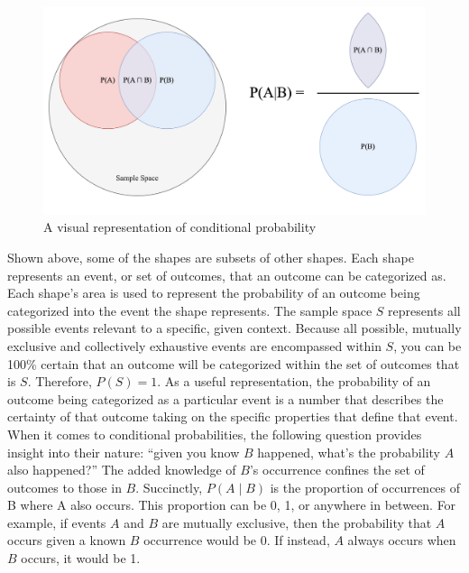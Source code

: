 \documentclass[12pt]{article}
\begin{document}
\begin{figure}[h!]
\centering
\includegraphics[width=1.0\textwidth]{assets/visual_1.png} 
\caption{A visual representation of conditional probability}
\label{fig:cond_prob}
\end{figure}

\noindent Shown above, some of the shapes are subsets of other shapes. Each shape represents an event, or set of outcomes, that an outcome can be categorized as. Each shape’s area is used to represent the probability of an outcome being categorized into the event the shape represents. The sample space $S$ represents all possible events relevant to a specific, given context. Because all possible, mutually exclusive and collectively exhaustive events are encompassed within $S$, you can be 100\% certain that an outcome will be categorized within the set of outcomes that is $S$. Therefore, $P(S) = 1$. As a useful representation, the probability of an outcome being categorized as a particular event is a number that describes the certainty of that outcome taking on the specific properties that define that event. When it comes to conditional probabilities, the following question provides insight into their nature: “given you know $B$ happened, what’s the probability $A$ also happened?” The added knowledge of $B$’s occurrence confines the set of outcomes to those in $B$. Succinctly, $P(A \mid B)$ is the proportion of occurrences of B where A also occurs. This proportion can be 0, 1, or anywhere in between. For example, if events $A$ and $B$ are mutually exclusive, then the probability that $A$ occurs given a known $B$ occurrence would be 0. If instead, $A$ always occurs when $B$ occurs, it would be 1.	
\end{document}
